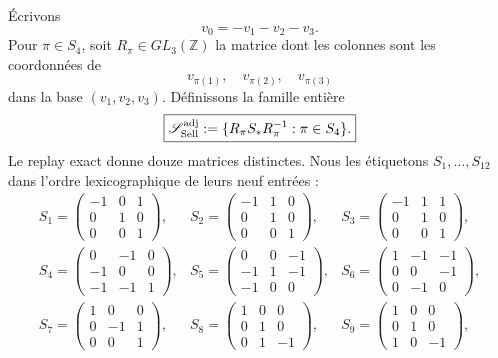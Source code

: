 \documentclass[11pt,a4paper]{article}
\begin{document}
Écrivons
\[
 v_0=-v_1-v_2-v_3.
\]
Pour $\pi\in S_4$, soit $R_\pi\in GL_3(\mathbb Z)$ la matrice dont les colonnes sont les coordonnées de
\[
 v_{\pi(1)},\quad v_{\pi(2)},\quad v_{\pi(3)}
\]
dans la base $(v_1,v_2,v_3)$. Définissons la famille entière
\begin{equation}\label{eq:v24-Sfamily}
 \boxed{
 \mathscr S_{\rm Sell}^{\rm adj}
 :=
 \{R_\pi S_*R_\pi^{-1}:\pi\in S_4\}.}
\end{equation}
Le replay exact donne douze matrices distinctes. Nous les étiquetons $S_1,\ldots,S_{12}$ dans l'ordre lexicographique de leurs neuf entrées :
\[
\begin{array}{lll}
S_1=\begin{pmatrix}-1&0&1\\0&1&0\\0&0&1\end{pmatrix},&
S_2=\begin{pmatrix}-1&1&0\\0&1&0\\0&0&1\end{pmatrix},&
S_3=\begin{pmatrix}-1&1&1\\0&1&0\\0&0&1\end{pmatrix},\\[3mm]
S_4=\begin{pmatrix}0&-1&0\\-1&0&0\\-1&-1&1\end{pmatrix},&
S_5=\begin{pmatrix}0&0&-1\\-1&1&-1\\-1&0&0\end{pmatrix},&
S_6=\begin{pmatrix}1&-1&-1\\0&0&-1\\0&-1&0\end{pmatrix},\\[3mm]
S_7=\begin{pmatrix}1&0&0\\0&-1&1\\0&0&1\end{pmatrix},&
S_8=\begin{pmatrix}1&0&0\\0&1&0\\0&1&-1\end{pmatrix},&
S_9=\begin{pmatrix}1&0&0\\0&1&0\\1&0&-1\end{pmatrix},\\[3mm]

\end{array}\]
\end{document}

